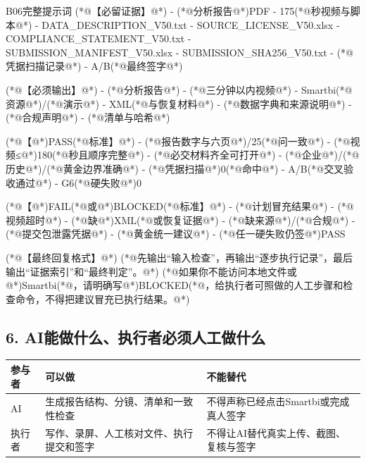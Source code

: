\documentclass[UTF8,openany,zihao=-4]{ctexbook}
\renewcommand{\_}{\textunderscore\allowbreak}
\begin{document}
\begin{PromptBox}{B06完整提示词}
(*@{\promptcjk 【必留证据】}@*)
- (*@{\promptcjk 分析报告}@*)PDF
- 175(*@{\promptcjk 秒视频与脚本}@*)
- DATA_DESCRIPTION_V50.txt
- SOURCE_LICENSE_V50.xlsx
- COMPLIANCE_STATEMENT_V50.txt
- SUBMISSION_MANIFEST_V50.xlsx
- SUBMISSION_SHA256_V50.txt
- (*@{\promptcjk 凭据扫描记录}@*)
- A/B(*@{\promptcjk 最终签字}@*)

(*@{\promptcjk 【必须输出】}@*)
- (*@{\promptcjk 分析报告}@*)
- (*@{\promptcjk 三分钟以内视频}@*)
- Smartbi(*@{\promptcjk 资源}@*)/(*@{\promptcjk 演示}@*)
- XML(*@{\promptcjk 与恢复材料}@*)
- (*@{\promptcjk 数据字典和来源说明}@*)
- (*@{\promptcjk 合规声明}@*)
- (*@{\promptcjk 清单与哈希}@*)

(*@{\promptcjk 【}@*)PASS(*@{\promptcjk 标准】}@*)
- (*@{\promptcjk 报告数字与六页}@*)/25(*@{\promptcjk 问一致}@*)
- (*@{\promptcjk 视频≤}@*)180(*@{\promptcjk 秒且顺序完整}@*)
- (*@{\promptcjk 必交材料齐全可打开}@*)
- (*@{\promptcjk 企业}@*)/(*@{\promptcjk 历史}@*)/(*@{\promptcjk 黄金边界准确}@*)
- (*@{\promptcjk 凭据扫描}@*)0(*@{\promptcjk 命中}@*)
- A/B(*@{\promptcjk 交叉验收通过}@*)
- G6(*@{\promptcjk 硬失败}@*)0

(*@{\promptcjk 【}@*)FAIL(*@{\promptcjk 或}@*)BLOCKED(*@{\promptcjk 标准】}@*)
- (*@{\promptcjk 计划冒充结果}@*)
- (*@{\promptcjk 视频超时}@*)
- (*@{\promptcjk 缺}@*)XML(*@{\promptcjk 或恢复证据}@*)
- (*@{\promptcjk 缺来源}@*)/(*@{\promptcjk 合规}@*)
- (*@{\promptcjk 提交包泄露凭据}@*)
- (*@{\promptcjk 黄金统一建议}@*)
- (*@{\promptcjk 任一硬失败仍签}@*)PASS

(*@{\promptcjk 【最终回复格式】}@*)
(*@{\promptcjk 先输出“输入检查”，再输出“逐步执行记录”，最后输出“证据索引”和“最终判定”。}@*)
(*@{\promptcjk 如果你不能访问本地文件或}@*)Smartbi(*@{\promptcjk ，请明确写}@*)BLOCKED(*@{\promptcjk ，给执行者可照做的人工步骤和检查命令，不得把建议冒充已执行结果。}@*)
\end{PromptBox}

\subsection*{6. AI能做什么、执行者必须人工做什么}
\noindent\begin{tabularx}{\textwidth}{@{}p{}XX@{}}
\toprule
\textbf{参与者} & \textbf{可以做} & \textbf{不能替代} \\
\midrule
AI & 生成报告结构、分镜、清单和一致性检查 & 不得声称已经点击Smartbi或完成真人签字 \\
执行者 & 写作、录屏、人工核对文件、执行提交和签字 & 不得让AI替代真实上传、截图、复核与签字 \\
\bottomrule
\end{tabularx}
\end{document}
